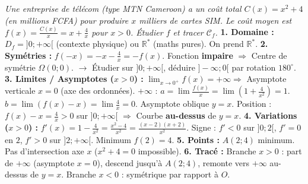\documentclass[11pt]{article}
\begin{document}
\begin{exoresolu}[Étude complète : $f(x)=x+\frac{4}{x}$ (Contexte : Coût moyen)]
\textit{Une entreprise de télécom (type MTN Cameroon) a un coût total $C(x)=x^2+4$ (en millions FCFA) pour produire $x$ milliers de cartes SIM. Le coût moyen est $f(x)=\frac{C(x)}{x}=x+\frac{4}{x}$ pour $x>0$. Étudier $f$ et tracer $\mathcal{C}_f$.}
\textbf{1. Domaine :} $D_f=]0;+\infty[$ (contexte physique) ou $\mathbb{R}^*$ (maths pures). On prend $\mathbb{R}^*$.
\textbf{2. Symétries :} $f(-x)=-x-\frac{4}{x}=-f(x)$. Fonction \textbf{impaire} $\Rightarrow$ Centre de symétrie $\Omega(0;0)$.
$\rightarrow$ Étudier sur $]0;+\infty[$, déduire $]-\infty;0[$ par rotation $180^\circ$.
\textbf{3. Limites / Asymptotes ($x>0$) :}
$\lim_{x\to 0^+}f(x)=+\infty \Rightarrow$ Asymptote verticale $x=0$ (axe des ordonnées).
$+\infty$ : $a=\lim\frac{f(x)}{x}=\lim(1+\frac{4}{x^2})=1$.
$b=\lim(f(x)-x)=\lim\frac{4}{x}=0$.
Asymptote oblique $y=x$.
Position : $f(x)-x=\frac{4}{x}>0$ sur $]0;+\infty[$ $\Rightarrow$ Courbe \textbf{au-dessus} de $y=x$.
\textbf{4. Variations ($x>0$) :} $f'(x)=1-\frac{4}{x^2}=\frac{x^2-4}{x^2}=\frac{(x-2)(x+2)}{x^2}$.
Signe : $f'<0$ sur $]0;2[$, $f'=0$ en $2$, $f'>0$ sur $]2;+\infty[$.
Minimum $f(2)=4$.
\textbf{5. Points :} $A(2;4)$ minimum. Pas d'intersection axe $x$ ($x^2+4=0$ impossible).
\textbf{6. Tracé :} Branche $x>0$ : part de $+\infty$ (asymptote $x=0$), descend jusqu'à $A(2;4)$, remonte vers $+\infty$ au-dessus de $y=x$. Branche $x<0$ : symétrique par rapport à $O$.
\end{exoresolu}
\end{document}
